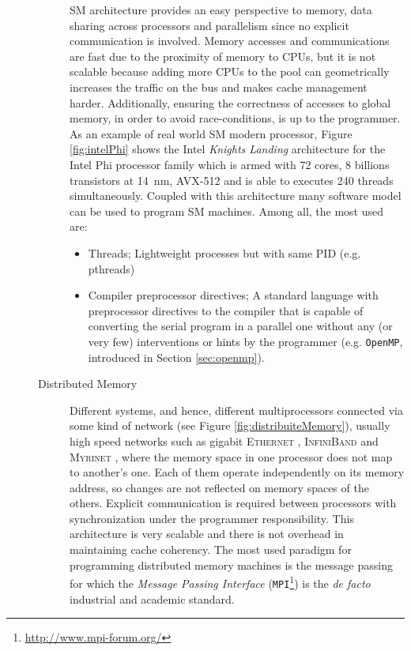 \begin{description}
\begin{description}
\begin{itemize}
\begin{figure}[b]
		\end{figure}
	\end{itemize}
	SM architecture provides an easy perspective to memory,	data sharing across processors and parallelism since no explicit communication is involved. Memory accesses and communications are fast due to the proximity of memory to CPUs, but it is not scalable because adding more CPUs to the pool can geometrically increases the traffic on the bus and makes cache management harder. Additionally, ensuring the correctness of accesses to global memory, in order to avoid race-conditions, is up to the programmer.
	As an example of real world SM modern processor, Figure \ref{fig:intelPhi} shows the Intel \textit{Knights Landing} architecture for the Intel Phi processor family which is armed with 72 cores, $8$ billions transistors at \SI{14}{\nano\metre}, AVX-512 and is able to executes 240 threads simultaneously.
	Coupled with this architecture many software model can be used to program
	SM machines. Among all, the most used are:
	\begin{itemize}
		\item Threads; Lightweight processes but with same PID (e.g. pthreads)
		\item Compiler preprocessor directives; A standard language with preprocessor directives to the compiler that is capable of converting the serial program in a parallel one without any (or very few) interventions or hints by the programmer (e.g. \texttt{OpenMP}, introduced in Section \ref{sec:openmp}).		
	\end{itemize}	
	\item [Distributed Memory] 	Different systems, and hence, different multiprocessors connected via some kind of network (see Figure \ref{fig:distribuiteMemory}), usually high speed networks such as gigabit \textsc{Ethernet} \cite{Spurgeon:2000:EDG:336070}, \textsc{InfiniBand} \cite{Shanley:2002:INF:579371} and \textsc{Myrinet} \cite{Boden:1995:MGL:623261.623898}, where the memory space in one processor does not map to another's one.
	Each of them operate independently on its memory address, so changes are not reflected on memory spaces of the others. Explicit communication is required between processors with synchronization under the programmer responsibility.
	This architecture  is very scalable and there is not  overhead in maintaining	cache coherency. 	
	The most used paradigm for programming distributed memory machines is the
	message passing for which the \textit{Message Passing Interface} (\texttt{MPI}\footnote{\url{http://www.mpi-forum.org/}}) \cite{Forum:1994:MMI:898758,Gropp:1999:UMA:555151} is the \textit{de facto} industrial and academic standard.
	

\end{description}
\end{description}
